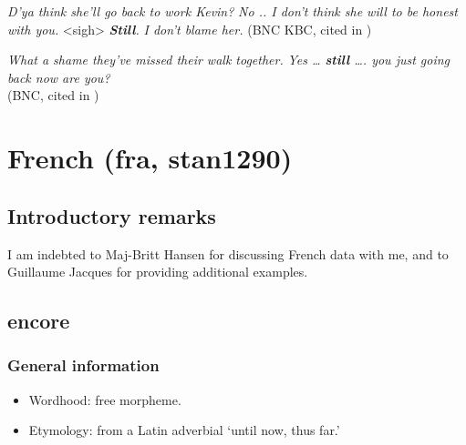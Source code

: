 \begin{exe}

	\ex 
	\begin{xlist}
	\textit{ D'ya think she'll go back to work Kevin?}
	 \textit{No .. I don't think she will to be honest with you.}
	 <sigh>
	\textit{ \textbf{Still}.}
	\textit{ I don't blame her.} (BNC KBC, cited in \cite[129]{Lewis2019})
	\end{xlist}
	
	\ex
	\begin{xlist}
		 \textit{What a shame they've missed their walk together.}
		 \textit{Yes … \textbf{still} …. you just going back now are you?}
		\\(BNC, cited in \cite[129]{Lewis2019})
	\end{xlist}
\end{exe}
 
\section{French (fra, stan1290)}
\label{appendixFrench}

\subsection{Introductory remarks}
I am indebted to Maj-Britt Hansen for discussing French data with me, and to Guillaume Jacques for providing additional examples.

\subsection{encore}
\label{appendixFrenchEncore}

\subsubsection{General information}
\begin{itemize}
	\item Wordhood: free morpheme.
	\item Etymology: from a Latin adverbial \lq until now, thus far.'
\end{itemize}


